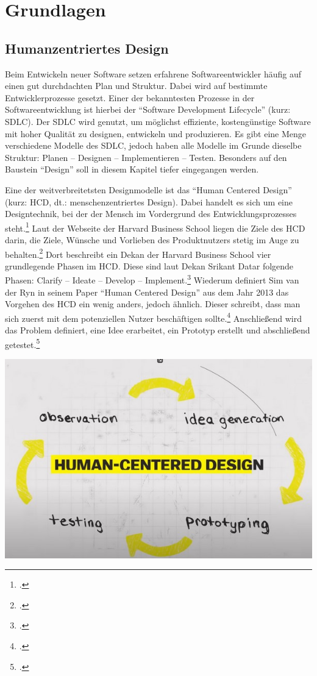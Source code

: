 
\chapter{Grundlagen}
\label{chapter:3}

\section{Humanzentriertes Design}

Beim Entwickeln neuer Software setzen erfahrene Softwareentwickler häufig auf einen gut durchdachten Plan und Struktur. Dabei wird auf bestimmte Entwicklerprozesse gesetzt. Einer der bekanntesten Prozesse in der Softwareentwicklung ist hierbei der “Software Development Lifecycle” (kurz: SDLC). Der SDLC wird genutzt, um möglichst effiziente, kostengünstige Software mit hoher Qualität zu designen, entwickeln und produzieren. Es gibt eine Menge verschiedene Modelle des SDLC, jedoch haben alle Modelle im Grunde dieselbe Struktur: Planen – Designen – Implementieren – Testen. Besonders auf den Baustein “Design” soll in diesem Kapitel tiefer eingegangen werden.

Eine der weitverbreitetsten Designmodelle ist das “Human Centered Design” (kurz: HCD, dt.: menschenzentriertes Design).  Dabei handelt es sich um eine Designtechnik, bei der der Mensch im Vordergrund des Entwicklungsprozesses steht.\footcite{hbsc:2020} Laut der Webseite der Harvard Business School liegen die Ziele des HCD darin, die Ziele, Wünsche und Vorlieben des Produktnutzers stetig im Auge zu behalten.\footcite{hbsc:2020} Dort beschreibt ein Dekan der Harvard Business School vier grundlegende Phasen im HCD. Diese sind laut Dekan Srikant Datar folgende Phasen: Clarify – Ideate – Develop – Implement.\footcite{hbsc:2020} Wiederum definiert Sim van der Ryn in seinem Paper “Human Centered Design” aus dem Jahr 2013 das Vorgehen des HCD ein wenig anders, jedoch ähnlich. Dieser schreibt, dass man sich zuerst mit dem potenziellen Nutzer beschäftigen sollte.\footcite{vanderryn:2013} Anschließend wird das Problem definiert, eine Idee erarbeitet, ein Prototyp erstellt und abschließend getestet.\footcite{vanderryn:2013}

\includegraphics[width=1\textwidth]{images/03/HCD.jpg}

